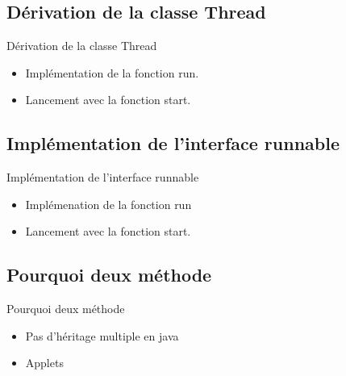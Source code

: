 \section{\sectitle}
\begin{frame}{\sectitle}
    \def\subsectitle{Dérivation de la classe Thread}
    \subsection{\subsectitle}
    \begin{block}{\subsectitle}
        \begin{itemize}
            \item Implémentation de la fonction run.
            \item Lancement avec la fonction start.
        \end{itemize}
    \end{block}

    \def\subsectitle{Implémentation de l'interface runnable}
    \subsection{\subsectitle}
    \begin{block}{\subsectitle}
        \begin{itemize}
            \item Implémenation de la fonction run
            \item Lancement avec la fonction start.
        \end{itemize}
    \end{block}
    \def\subsectitle{Pourquoi deux méthode}
    \subsection{\subsectitle}
    \begin{block}{\subsectitle}
        \begin{itemize}
            \item Pas d'héritage multiple en java
            \item Applets 
        \end{itemize}
    \end{block}
\end{frame}


